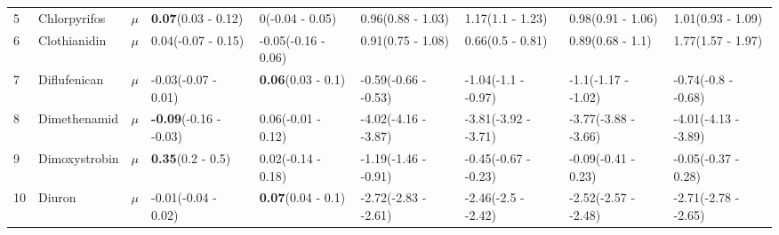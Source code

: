 \begin{longtable}{lp{2cm}p{0.6cm}p{1.8cm}p{1.8cm}p{1.8cm}p{1.8cm}p{1.8cm}p{1.8cm}}
  5 & Chlorpyrifos & $\mu$ & \textbf{0.07}\newline (0.03 - 0.12) & 0\newline (-0.04 - 0.05) & 0.96\newline (0.88 - 1.03) & 1.17\newline (1.1 - 1.23) & 0.98\newline (0.91 - 1.06) & 1.01\newline (0.93 - 1.09) \\ 
  6 & Clothianidin & $\mu$ & 0.04\newline (-0.07 - 0.15) & -0.05\newline (-0.16 - 0.06) & 0.91\newline (0.75 - 1.08) & 0.66\newline (0.5 - 0.81) & 0.89\newline (0.68 - 1.1) & 1.77\newline (1.57 - 1.97) \\ 
  7 & Diflufenican & $\mu$ & -0.03\newline (-0.07 - 0.01) & \textbf{0.06}\newline (0.03 - 0.1) & -0.59\newline (-0.66 - -0.53) & -1.04\newline (-1.1 - -0.97) & -1.1\newline (-1.17 - -1.02) & -0.74\newline (-0.8 - -0.68) \\ 
  8 & Dimethenamid & $\mu$ & \textbf{-0.09}\newline (-0.16 - -0.03) & 0.06\newline (-0.01 - 0.12) & -4.02\newline (-4.16 - -3.87) & -3.81\newline (-3.92 - -3.71) & -3.77\newline (-3.88 - -3.66) & -4.01\newline (-4.13 - -3.89) \\ 
  9 & Dimoxystrobin & $\mu$ & \textbf{0.35}\newline (0.2 - 0.5) & 0.02\newline (-0.14 - 0.18) & -1.19\newline (-1.46 - -0.91) & -0.45\newline (-0.67 - -0.23) & -0.09\newline (-0.41 - 0.23) & -0.05\newline (-0.37 - 0.28) \\ 
  10 & Diuron & $\mu$ & -0.01\newline (-0.04 - 0.02) & \textbf{0.07}\newline (0.04 - 0.1) & -2.72\newline (-2.83 - -2.61) & -2.46\newline (-2.5 - -2.42) & -2.52\newline (-2.57 - -2.48) & -2.71\newline (-2.78 - -2.65) \\ 

\end{longtable}
